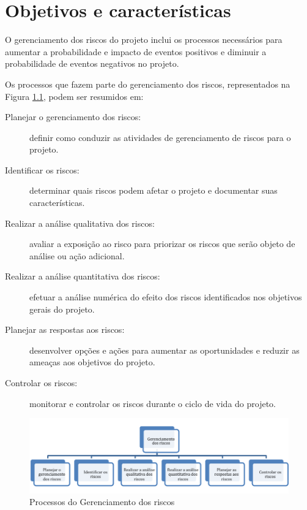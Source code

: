 
\chapter{Objetivos e características}

O gerenciamento dos riscos do projeto inclui os processos necessários para aumentar a probabilidade e impacto de eventos positivos e diminuir a probabilidade de eventos negativos no projeto.

Os processos que fazem parte do gerenciamento dos riscos, representados na Figura \ref{fig:proc:ger:riscos}, podem ser resumidos em:

\begin{description}
	
	\item[Planejar o gerenciamento dos riscos:] definir como conduzir as atividades de gerenciamento de riscos para o projeto.

	\item[Identificar os riscos:] determinar quais riscos podem afetar o projeto e documentar suas características.

	\item[Realizar a análise qualitativa dos riscos:]  avaliar a exposição ao risco para priorizar os riscos que serão objeto de análise ou ação adicional.

	\item[Realizar a análise quantitativa dos riscos:] efetuar a análise numérica do efeito dos riscos identificados nos objetivos gerais do projeto.

	\item[Planejar as respostas aos riscos:] desenvolver opções e ações para aumentar as oportunidades e reduzir as ameaças aos objetivos do projeto.

	\item[Controlar os riscos:] monitorar e controlar os riscos durante o ciclo de vida do projeto.	

\end{description}

\begin{figure}[!h]
	\centering
	\includegraphics[scale=0.75]{Figuras/gerenciamento_riscos.png}
	\caption{Processos do Gerenciamento dos riscos}
	\label{fig:proc:ger:riscos}
\end{figure}

